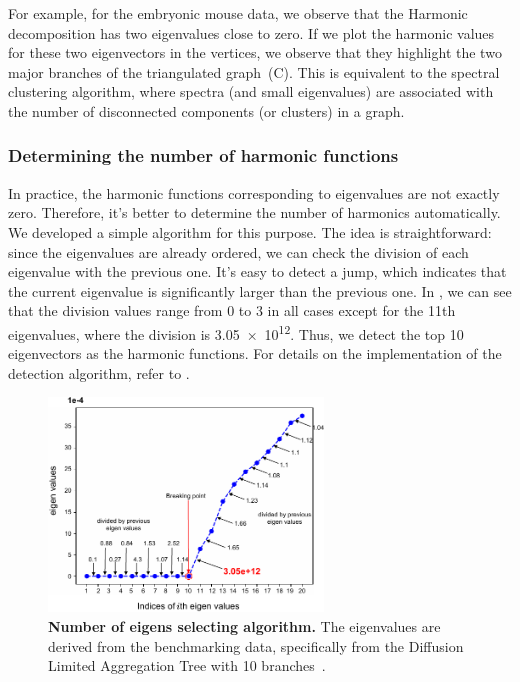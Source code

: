 For example, for the embryonic mouse data, we observe that the Harmonic decomposition has two eigenvalues close to zero. If we plot the harmonic values for these two eigenvectors in the vertices, we observe that they highlight the two major branches of the triangulated graph~(C). This is equivalent to the spectral clustering algorithm, where spectra (and small eigenvalues) are associated with the number of disconnected components (or clusters) in a graph.

\subsubsection{Determining the number of harmonic functions}
In practice, the harmonic functions corresponding to eigenvalues are not exactly zero. Therefore, it's better to determine the number of harmonics automatically. We developed a simple algorithm for this purpose. The idea is straightforward: since the eigenvalues are already ordered, we can check the division of each eigenvalue with the previous one. It's easy to detect a jump, which indicates that the current eigenvalue is significantly larger than the previous one. In , we can see that the division values range from 0 to 3 in all cases except for the 11th eigenvalues, where the division is \num{3.05e+12}. Thus, we detect the top 10 eigenvectors as the harmonic functions. For details on the implementation of the detection algorithm, refer to .

\begin{figure}[!ht]
    \centering
    \includegraphics[width=0.65\textwidth]{breakingpoint/fig}
    \vspace{0.1cm}
    \caption[Number of eigens selecting algorithm.]{\textbf{Number of eigens selecting algorithm.} The eigenvalues are derived from the benchmarking data, specifically from the Diffusion Limited Aggregation Tree with 10 branches~.}
    \label{fig:breakingpoint}
\end{figure}

